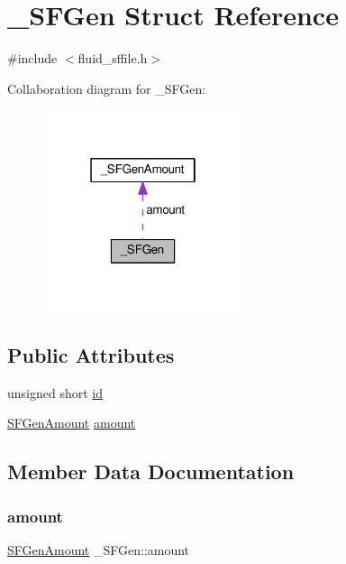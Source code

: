\hypertarget{struct__SFGen}{}\section{\+\_\+\+S\+F\+Gen Struct Reference}
\label{struct__SFGen}


{\ttfamily \#include $<$fluid\+\_\+sffile.\+h$>$}



Collaboration diagram for \+\_\+\+S\+F\+Gen\+:
\nopagebreak
\begin{figure}[H]
\begin{center}
\leavevmode
\includegraphics[width=166pt]{struct__SFGen__coll__graph}
\end{center}
\end{figure}
\subsection*{Public Attributes}
\begin{DoxyCompactItemize}
\item 
unsigned short \hyperlink{struct__SFGen_a3b54dafd1bbf1c18e002c78dcda927cd}{id}
\item 
\hyperlink{fluid__sffile_8h_a3dae7c1c935af79f85acc57b6e2336e7}{S\+F\+Gen\+Amount} \hyperlink{struct__SFGen_aeebf8b4ac1c29f6f8f96e26897172403}{amount}
\end{DoxyCompactItemize}


\subsection{Member Data Documentation}
\mbox{\label{struct__SFGen_aeebf8b4ac1c29f6f8f96e26897172403}} 
\subsubsection{\texorpdfstring{amount}{amount}}
{\footnotesize\ttfamily \hyperlink{fluid__sffile_8h_a3dae7c1c935af79f85acc57b6e2336e7}{S\+F\+Gen\+Amount} \+\_\+\+S\+F\+Gen\+::amount}

